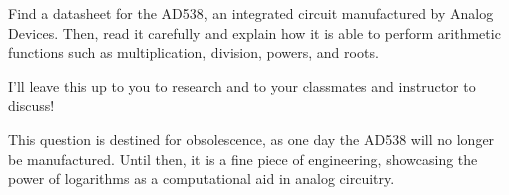 

Find a datasheet for the AD538, an integrated circuit manufactured by Analog Devices.  Then, read it carefully and explain how it is able to perform arithmetic functions such as multiplication, division, powers, and roots.







I'll leave this up to you to research and to your classmates and instructor to discuss!







This question is destined for obsolescence, as one day the AD538 will no longer be manufactured.  Until then, it is a fine piece of engineering, showcasing the power of logarithms as a computational aid in analog circuitry.




